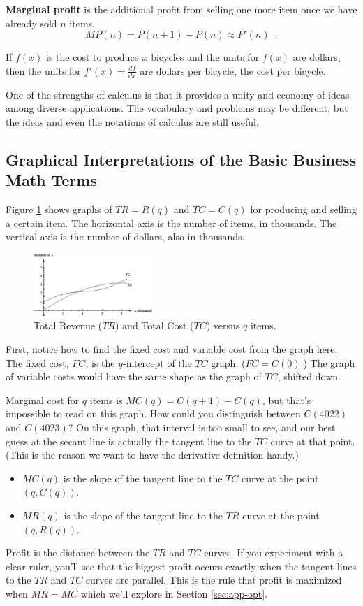 {\bf Marginal profit} is the additional profit from selling one more item once we have already sold $n$ items. 
$$MP(n) = P(n+1)-P(n) \approx P'(n) \enspace.$$

If $f(x)$ is the cost to produce $x$ bicycles and the units for $f(x)$ are dollars, then the units for $f'(x)=\frac{df}{dx}$ are dollars per bicycle, the cost per bicycle.

One of the strengths of calculus is that it provides a unity and economy of ideas among diverse applications. The vocabulary and problems may be different, but the ideas and even the notations of calculus are still useful.

\subsection{Graphical Interpretations of the Basic Business Math Terms}
Figure \ref{fig:2-3-trandtc} shows graphs of $TR = R(q)$ and $TC = C(q)$ for producing and selling a certain item. The horizontal axis is the number of items, in thousands. The vertical axis is the number of dollars, also in thousands.

\begin{figure}[!ht]
  \centering
    \includegraphics[width=0.4\textwidth]{img/chap2/image035.png}
    \caption{Total Revenue ($TR$) and Total Cost ($TC$) versus $q$ items.}
    \label{fig:2-3-trandtc}
\end{figure}
First, notice how to find the fixed cost and variable cost from the graph here. The fixed cost, $FC$, is the $y$-intercept of the $TC$ graph. ($FC=C(0)$.) The graph of variable costs would have the same shape as the graph of $TC$, shifted down.

Marginal cost for $q$ items is $MC(q)=C(q+1)-C(q)$, but that's impossible to read on this graph. How could you distinguish between $C(4022)$ and $C(4023)$? On this graph, that interval is too small to see, and our best guess at the secant line is actually the tangent line to the $TC$ curve at that point. (This is the reason we want to have the derivative definition handy.)
\begin{itemize}[label={}]
    \item $MC(q)$ is the slope of the tangent line to the $TC$ curve at the point $(q, C(q))$.
    \item $MR(q)$ is the slope of the tangent line to the $TR$ curve at the point $(q, R(q))$.
\end{itemize}
Profit is the distance between the $TR$ and $TC$ curves. If you experiment with a clear ruler, you'll see that the biggest profit occurs exactly when the tangent lines to the $TR$ and $TC$ curves are parallel. This is the rule that profit is maximized when $MR=MC$ which we'll explore in Section \ref{sec:app-opt}.

